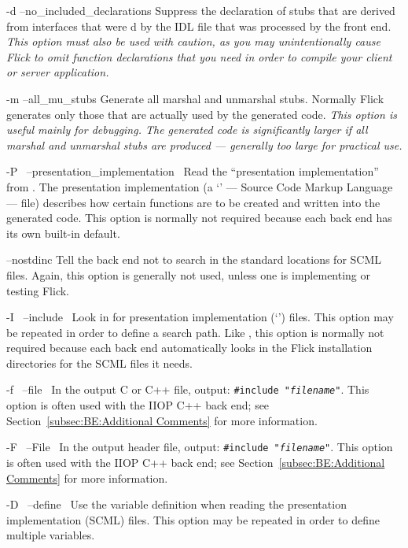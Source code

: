 \begin{optionlist}
  \item[-d \oroption{} --no_included_declar\-ations]
  Suppress the declaration of stubs that are derived from interfaces that were
  d by the IDL file that was processed by the front end.
  \emph{This option must also be used with caution, as you may unintentionally
  cause Flick to omit function declarations that you need in order to compile
  your client or server application.}

  \item[-m \oroption{} --all_mu_stubs]
  Generate all marshal and unmarshal stubs.  Normally Flick generates only
  those that are actually used by the generated code.  \emph{This option is
  useful mainly for debugging.  The generated code is significantly larger if
  all marshal and unmarshal stubs are produced --- generally too large for
  practical use.}

  \item[-P~\optionarg{filename} \oroption{}
        --presentation_imple\-mentation~\optionarg{filename}]
  Read the ``presentation implementation'' from .  The
  presentation implementation (a `' --- Source Code Markup
  Language --- file) describes how certain functions are to be created and
  written into the generated code.  This option is normally not required
  because each back end has its own built-in default.

  \item[--nostdinc]
  Tell the back end not to search in the standard locations for SCML files.
  Again, this option is generally not used, unless one is implementing or
  testing Flick.

  \item[-I~\optionarg{directory} \oroption{} --include~\optionarg{directory}]
  Look in  for presentation implementation
  (`') files.  This option may be repeated in order to define a
  search path.  Like , this option is normally not required because
  each back end automatically looks in the Flick installation directories for
  the SCML files it needs.

  \item[-f~\optionarg{filename} \oroption{} --file~\optionarg{filename}]
  In the output C or C++ file, output: \texttt{\#include "\emph{filename}"}.
  This option is often used with the IIOP C++ back end; see
  Section~\ref{subsec:BE:Additional Comments} for more information.

  \item[-F~\optionarg{filename} \oroption{} --File~\optionarg{filename}]
  In the output header file, output: \texttt{\#include "\emph{filename}"}.
  This option is often used with the IIOP C++ back end; see
  Section~\ref{subsec:BE:Additional Comments} for more information.

  \item[-D~\optionarg{vardef} \oroption{} --define~\optionarg{vardef}]
  Use the variable definition  when reading the presentation
  implementation (SCML) files.  This option may be repeated in order to define
  multiple variables.
\end{optionlist}

